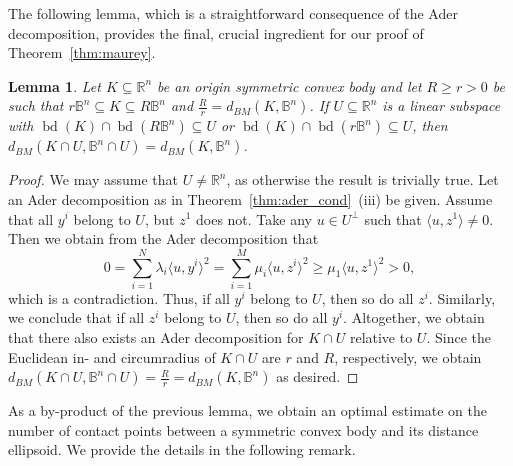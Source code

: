 \documentclass[12pt,a4paper]{article}
\newtheorem{lem}[twr]{Lemma}
\theoremstyle{definition}
\DeclareMathOperator{\bd}{bd}
\newcommand\R{\mathbb{R}}
\newcommand\B{\mathbb{B}}
\begin{document}
The following lemma, which is a straightforward consequence of the Ader decomposition, provides the final, crucial ingredient for our proof of Theorem~\ref{thm:maurey}.



\begin{lem}
\label{lem:contact_space}
Let $K \subseteq \R^n$ be an origin symmetric convex body and let $R \geq r > 0$ be such that $r\B^n \subseteq K \subseteq R\B^n$ and $\frac{R}{r} = d_{BM}(K,\B^n)$. If $U \subseteq \R^n$ is a linear subspace with $\bd(K) \cap \bd(R\B^n) \subseteq U$ or $\bd(K) \cap \bd(r\B^n) \subseteq U$, then $d_{BM}(K \cap U,\B^n \cap U) = d_{BM}(K,\B^n)$.
\end{lem}
\begin{proof}
We may assume that $U \neq \R^n$, as otherwise the result is trivially true. Let an Ader decomposition as in Theorem~\ref{thm:ader_cond}~(iii) be given. Assume that all $y^i$ belong to $U$, but $z^1$ does not. Take any $u \in U^\perp$ such that $\langle u, z^1 \rangle \neq 0$. Then we obtain from the Ader decomposition that
$$ 0 = \sum_{i=1}^N \lambda_i \langle u, y^i \rangle^2 = \sum_{i=1}^M \mu_i \langle u, z^i \rangle^2 \geq \mu_1 \langle u, z^1 \rangle^2 > 0, $$
which is a contradiction. Thus, if all $y^i$ belong to $U$, then so do all $z^i$. Similarly, we conclude that if all $z^i$ belong to $U$, then so do all $y^i$. Altogether, we obtain that there also exists an Ader decomposition for $K \cap U$ relative to $U$. Since the Euclidean in- and circumradius of $K \cap U$ are $r$ and $R$, respectively, we obtain $d_{BM}(K \cap U, \B^n \cap U) = \frac{R}{r} = d_{BM}(K,\B^n)$ as desired.
\end{proof}



As a by-product of the previous lemma, we obtain an optimal estimate on the number of contact points between a symmetric convex body and its distance ellipsoid. We provide the details in the following remark.
\end{document}
